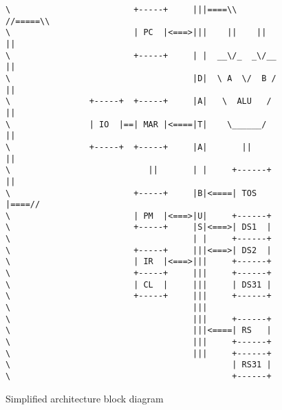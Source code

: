 \begin{figure*}[h!]
\begin{lstlisting}
\                         +-----+     |||====\\    //=====\\
\                         | PC  |<===>|||    ||    ||     ||
\                         +-----+     | |  __\/_  _\/__   ||
\                                     |D|  \ A  \/  B /   ||
\                +-----+  +-----+     |A|   \  ALU   /    ||
\                | IO  |==| MAR |<====|T|    \______/     ||
\                +-----+  +-----+     |A|       ||        ||
\                            ||       | |     +------+    ||
\                         +-----+     |B|<====| TOS  |====//
\                         | PM  |<===>|U|     +------+
\                         +-----+     |S|<===>| DS1  |
\                                     | |     +------+
\                         +-----+     |||<===>| DS2  |
\                         | IR  |<===>|||     +------+
\                         +-----+     |||     +------+
\                         | CL  |     |||     | DS31 |
\                         +-----+     |||     +------+
\                                     |||
\                                     |||     +------+
\                                     |||<====| RS   |
\                                     |||     +------+
\                                     |||     +------+
\                                             | RS31 |
\                                             +------+
\end{lstlisting}
\caption[Architecture Block Diagram]{Simplified architecture block diagram}
\end{figure*}

